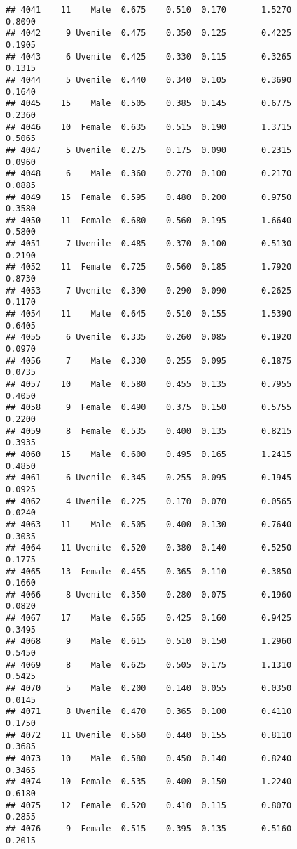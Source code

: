 \documentclass[
]{article}
\begin{document}
\begin{verbatim}
## 4041    11    Male  0.675    0.510  0.170       1.5270         0.8090
## 4042     9 Uvenile  0.475    0.350  0.125       0.4225         0.1905
## 4043     6 Uvenile  0.425    0.330  0.115       0.3265         0.1315
## 4044     5 Uvenile  0.440    0.340  0.105       0.3690         0.1640
## 4045    15    Male  0.505    0.385  0.145       0.6775         0.2360
## 4046    10  Female  0.635    0.515  0.190       1.3715         0.5065
## 4047     5 Uvenile  0.275    0.175  0.090       0.2315         0.0960
## 4048     6    Male  0.360    0.270  0.100       0.2170         0.0885
## 4049    15  Female  0.595    0.480  0.200       0.9750         0.3580
## 4050    11  Female  0.680    0.560  0.195       1.6640         0.5800
## 4051     7 Uvenile  0.485    0.370  0.100       0.5130         0.2190
## 4052    11  Female  0.725    0.560  0.185       1.7920         0.8730
## 4053     7 Uvenile  0.390    0.290  0.090       0.2625         0.1170
## 4054    11    Male  0.645    0.510  0.155       1.5390         0.6405
## 4055     6 Uvenile  0.335    0.260  0.085       0.1920         0.0970
## 4056     7    Male  0.330    0.255  0.095       0.1875         0.0735
## 4057    10    Male  0.580    0.455  0.135       0.7955         0.4050
## 4058     9  Female  0.490    0.375  0.150       0.5755         0.2200
## 4059     8  Female  0.535    0.400  0.135       0.8215         0.3935
## 4060    15    Male  0.600    0.495  0.165       1.2415         0.4850
## 4061     6 Uvenile  0.345    0.255  0.095       0.1945         0.0925
## 4062     4 Uvenile  0.225    0.170  0.070       0.0565         0.0240
## 4063    11    Male  0.505    0.400  0.130       0.7640         0.3035
## 4064    11 Uvenile  0.520    0.380  0.140       0.5250         0.1775
## 4065    13  Female  0.455    0.365  0.110       0.3850         0.1660
## 4066     8 Uvenile  0.350    0.280  0.075       0.1960         0.0820
## 4067    17    Male  0.565    0.425  0.160       0.9425         0.3495
## 4068     9    Male  0.615    0.510  0.150       1.2960         0.5450
## 4069     8    Male  0.625    0.505  0.175       1.1310         0.5425
## 4070     5    Male  0.200    0.140  0.055       0.0350         0.0145
## 4071     8 Uvenile  0.470    0.365  0.100       0.4110         0.1750
## 4072    11 Uvenile  0.560    0.440  0.155       0.8110         0.3685
## 4073    10    Male  0.580    0.450  0.140       0.8240         0.3465
## 4074    10  Female  0.535    0.400  0.150       1.2240         0.6180
## 4075    12  Female  0.520    0.410  0.115       0.8070         0.2855
## 4076     9  Female  0.515    0.395  0.135       0.5160         0.2015

\end{verbatim}
\end{document}
